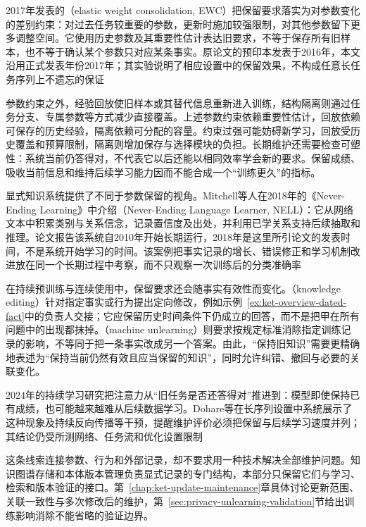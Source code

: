 2017年发表的（elastic weight consolidation, EWC）把保留要求落实为对参数变化的差别约束：对过去任务较重要的参数，更新时施加较强限制，对其他参数留下更多调整空间。它使用历史参数及其重要性估计表达旧要求，不等于保存所有旧样本，也不等于确认某个参数只对应某条事实。原论文的预印本发表于2016年，本文沿用正式发表年份2017年；其实验说明了相应设置中的保留效果，不构成任意长任务序列上不遗忘的保证

参数约束之外，经验回放使旧样本或其替代信息重新进入训练，结构隔离则通过任务分支、专属参数等方式减少直接覆盖。上述参数约束依赖重要性估计，回放依赖可保存的历史经验，隔离依赖可分配的容量。约束过强可能妨碍新学习，回放受历史覆盖和预算限制，隔离则增加保存与选择模块的负担。长期维护还需要检查可塑性：系统当前仍答得对，不代表它以后还能以相同效率学会新的要求。保留成绩、吸收当前信息和维持后续学习能力因而不能合成一个“训练更久”的指标。

显式知识系统提供了不同于参数保留的视角。Mitchell等人在2018年的《Never-Ending Learning》中介绍（Never-Ending Language Learner, NELL）：它从网络文本中积累类别与关系信念，记录置信度及出处，并利用已学关系支持后续抽取和推理。论文报告该系统自2010年开始长期运行，2018年是这里所引论文的发表时间，不是系统开始学习的时间。该案例把事实记录的增长、错误修正和学习机制改进放在同一个长期过程中考察，而不只观察一次训练后的分类准确率

在持续预训练与连续使用中，保留要求还会随事实有效性而变化。（knowledge editing）针对指定事实或行为提出定向修改，例如示例~\ref{ex:ket-overview-dated-fact}中的负责人交接；它应保留历史时间条件下仍成立的回答，而不是把甲在所有问题中的出现都抹掉。（machine unlearning）则要求按规定标准消除指定训练记录的影响，不等同于把一条事实改成另一个答案。由此，“保持旧知识”需要更精确地表述为“保持当前仍然有效且应当保留的知识”，同时允许纠错、撤回与必要的关联变化。

2024年的持续学习研究把注意力从“旧任务是否还答得对”推进到：模型即使保持已有成绩，也可能越来越难从后续数据学习。Dohare等在长序列设置中系统展示了这种现象及持续反向传播等干预，提醒维护评价必须把保留与后续学习速度并列；其结论仍受所测网络、任务流和优化设置限制

这条线索连接参数、行为和外部记录，却不要求用一种技术解决全部维护问题。知识图谱存储和本体版本管理负责显式记录的专门结构，本部分只保留它们与学习、检索和版本验证的接口。第~\ref{chap:ket-update-maintenance}章具体讨论更新范围、关联一致性与多次修改后的维护，第~\ref{sec:privacy-unlearning-validation}节给出训练影响消除不能省略的验证边界。

